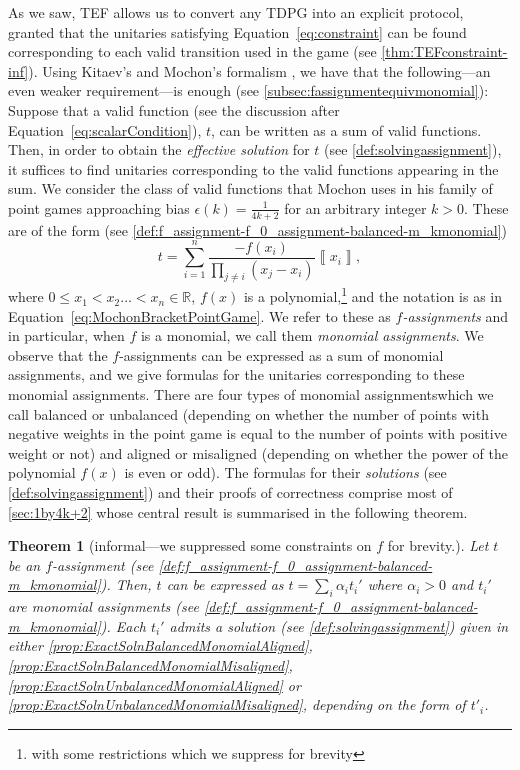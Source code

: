 \documentclass{article}
\newtheorem{theorem}{Theorem}\newtheorem{lemma}[theorem]{Lemma}\newtheorem{proposition}[theorem]{Proposition}\newtheorem{corollary}[theorem]{Corollary}\newtheorem{definition}[theorem]{Definition}\newtheorem{claim}[theorem]{Claim}\newtheorem{remark}[theorem]{Remark}\newtheorem{example}[theorem]{Example}
\begin{document}
As we saw, TEF allows us to convert any TDPG into an explicit protocol, granted that
the unitaries satisfying Equation~\eqref{eq:constraint} can be found corresponding
to each valid transition
used in the game (see \cref{thm:TEFconstraint-inf}). Using Kitaev's and Mochon's
formalism \cite{Mochon07}, we have that the following---an even weaker
requirement---is enough (see \cref{subsec:fassignmentequivmonomial}): Suppose that a valid function (see the discussion after Equation~\eqref{eq:scalarCondition}), $t$, can be written
as a sum of valid functions. Then, in order to obtain the \emph{effective solution} for $t$ (see \cref{def:solvingassignment}), it suffices to find unitaries corresponding
to the valid functions appearing in the sum.
We consider the class of valid functions that Mochon uses in his family
of point games approaching bias $\epsilon(k)=\frac{1}{4k+2}$ for an arbitrary integer $k>0$.
These are of the form (see \cref{def:f_assignment-f_0_assignment-balanced-m_kmonomial})
\begin{displaymath}
  t=\sum_{i=1}^{n}\frac{-f(x_{i})}{\prod_{j\neq i}(x_{j}-x_{i})}\left\llbracket x_{i}\right\rrbracket,
\end{displaymath}
where $0\le x_{1}<x_{2}\dots<x_{n}\in \mathbb{R}$, $f(x)$ is a polynomial,\footnote{with some restrictions which we suppress for brevity} and the notation is as in Equation~\eqref{eq:MochonBracketPointGame}.
We refer to these as \emph{$f$-assignments} and in particular, when
$f$ is a monomial, we call them \emph{monomial assignments}. We observe that the $f$-assignments
can be expressed as a sum of monomial assignments, and we give formulas for the unitaries corresponding to these monomial assignments. There
are four types of monomial assignments\textemdash which we call balanced or unbalanced (depending on whether the number of points with negative weights in the point game is equal to the number of points with positive weight or not) and
aligned or misaligned (depending on whether the power of the polynomial $f(x)$ is even or odd). The formulas for their \emph{solutions} (see \cref{def:solvingassignment}) and their
proofs of correctness comprise most of \cref{sec:1by4k+2} whose central result is summarised in the following theorem.
\begin{theorem}[informal---we suppressed some constraints on $f$ for brevity.]
  Let $t$ be an $f$-assignment (see \cref{def:f_assignment-f_0_assignment-balanced-m_kmonomial}).
  Then, $t$ can be expressed as $t=\sum_{i}\alpha_{i}t_{i}'$ where
  $\alpha_{i}>0$ and $t_{i}'$ are monomial assignments (see \cref{def:f_assignment-f_0_assignment-balanced-m_kmonomial}).
  Each $t_{i}'$ admits a solution (see \cref{def:solvingassignment}) given in either  \cref{prop:ExactSolnBalancedMonomialAligned},
  \cref{prop:ExactSolnBalancedMonomialMisaligned}, \cref{prop:ExactSolnUnbalancedMonomialAligned}
  or \cref{prop:ExactSolnUnbalancedMonomialMisaligned}, depending on
  the form of $t'_{i}$. \label{thm:Main}
\end{theorem}
\end{document}
